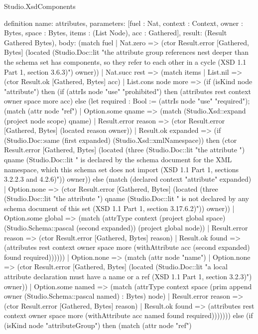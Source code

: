 \begin{lexlean}{Studio.XsdComponents}
\begin{semanticmodule}
definition{
  name: attributes,
  parameters: [fuel : Nat, context : Context, owner : Bytes, space : Bytes, items : (List Node), acc : Gathered],
  result: (Result Gathered Bytes),
  body: (match fuel
    | Nat.zero => (ctor Result.error [Gathered, Bytes] (located (Studio.Doc::lit "the attribute group references nest deeper than the schema set has components, so they refer to each other in a cycle (XSD 1.1 Part 1, section 3.6.3)") owner))
    | Nat.succ rest => (match items
      | List.nil => (ctor Result.ok [Gathered, Bytes] acc)
      | List.cons node more => (if (isKind node "attribute") then (if (attrIs node "use" "prohibited") then (attributes rest context owner space more acc) else (let required : Bool := (attrIs node "use" "required"); (match (attr node "ref")
        | Option.some qname => (match (Studio.Xsd::expand (project node scope) qname)
          | Result.error reason => (ctor Result.error [Gathered, Bytes] (located reason owner))
          | Result.ok expanded => (if (Studio.Doc::same (first expanded) (Studio.Xsd::xmlNamespace)) then (ctor Result.error [Gathered, Bytes] (located (three (Studio.Doc::lit "the attribute ") qname (Studio.Doc::lit " is declared by the schema document for the XML namespace, which this schema set does not import (XSD 1.1 Part 1, sections 3.2.2.3 and 4.2.6)")) owner)) else (match (declared context "attribute" expanded)
            | Option.none => (ctor Result.error [Gathered, Bytes] (located (three (Studio.Doc::lit "the attribute ") qname (Studio.Doc::lit " is not declared by any schema document of this set (XSD 1.1 Part 1, section 3.17.6.2)")) owner))
            | Option.some global => (match (attrType context (project global space) (Studio.Schema::pascal (second expanded)) (project global node))
              | Result.error reason => (ctor Result.error [Gathered, Bytes] reason)
              | Result.ok found => (attributes rest context owner space more (withAttribute acc (second expanded) found required))))))
        | Option.none => (match (attr node "name")
          | Option.none => (ctor Result.error [Gathered, Bytes] (located (Studio.Doc::lit "a local attribute declaration must have a name or a ref (XSD 1.1 Part 1, section 3.2.3)") owner))
          | Option.some named => (match (attrType context space (prim append owner (Studio.Schema::pascal named) : Bytes) node)
            | Result.error reason => (ctor Result.error [Gathered, Bytes] reason)
            | Result.ok found => (attributes rest context owner space more (withAttribute acc named found required))))))) else (if (isKind node "attributeGroup") then (match (attr node "ref")
}
\end{semanticmodule}
\end{lexlean}

